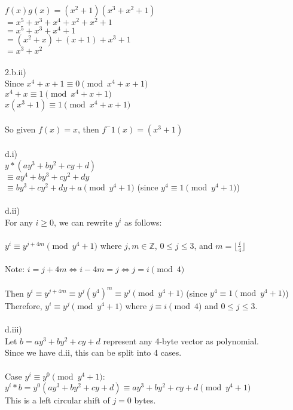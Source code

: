 \documentclass{assignment}
\newcommand\tab[1][0.5cm]{\hspace*{#1}}
\begin{document}
\begin{problemlist}
\begin{problem}
\begin{answer}
$f(x)g(x)=(x^2+1)(x^3+x^2+1)$\\
$=x^5+x^3+x^4+x^2+x^2+1$\\
$=x^5+x^3+x^4+1$\\
$=(x^2+x)+(x+1)+x^3+1$\\
$=x^3+x^2$\\
\\
2.b.ii)\\
Since $x^4+x+1\equiv 0  \pmod{x^4+x+1}$\\
$x^4+x\equiv 1  \pmod{x^4+x+1}$\\
$x(x^3+1)\equiv 1  \pmod{x^4+x+1}$\\
\\
So given $f(x)=x$, then $f^-1(x)=(x^3+1)$\\
\\
d.i)\\
$y*(ay^3+by^2+cy+d)$\\
$\equiv ay^4+by^3+cy^2+dy$\\
$\equiv by^3+cy^2+dy+a \pmod {y^4+1}$ \tab (since $y^4\equiv 1 \pmod {y^4+1}$)\\
\\
d.ii)\\
For any $i \geq 0$, we can rewrite $y^i$ as follows:\\
\\
$y^i\equiv y^{j+4m}\pmod {y^4+1}$ where $j,m\in \mathbb{Z}$, $0\leq j \leq 3$, and $m = \lfloor\frac{i}{4}\rfloor$\\
\\
Note: $i=j+4m \iff i-4m=j \iff j=i \pmod 4$\\
\\
Then $y^i\equiv y^{j+4m} \equiv y^j(y^4)^m\equiv y^j \pmod {y^4+1}$ \tab (since $y^4\equiv 1\pmod {y^4+1}$)\\
Therefore, $y^i\equiv y^j \pmod {y^4+1}$ where $j\equiv i \pmod 4$ and $0\leq j \leq 3$.\\
\\
d.iii)\\
Let $b=ay^3+by^2+cy+d$ represent any 4-byte vector as polynomial.\\
Since we have d.ii, this can be split into 4 cases.\\
\\
Case $y^i\equiv y^0 \pmod {y^4+1}$: \\
\tab$y^i*b=y^0(ay^3+by^2+cy+d)\equiv ay^3+by^2+cy+d \pmod {y^4+1}$ \\
\tab This is a left circular shift of $j=0$ bytes.\\
\\

\end{answer}
\end{problem}
\end{problemlist}
\end{document}
